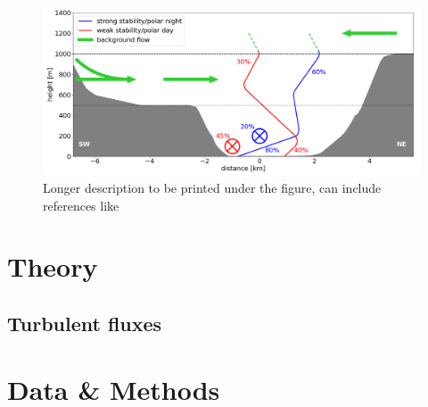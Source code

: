 \begin{figure}[htbp]		%
    \centering				%
    \includegraphics[width=\textwidth]{./figures_john/schematic_ABL.png}
    \vspace{-20pt}		%
    \caption[Short description for list of figures]{Longer description to be printed under the figure, can include references like \citep{stull1988introduction}} %
	\label{john:fig1}		%
\end{figure}

\lipsum



\section{Theory}
\label{john:theory}
\subsection{Turbulent fluxes}
\label{john:fluxes}
\lipsum


\section{Data \& Methods}
\label{john:methods}
\lipsum

